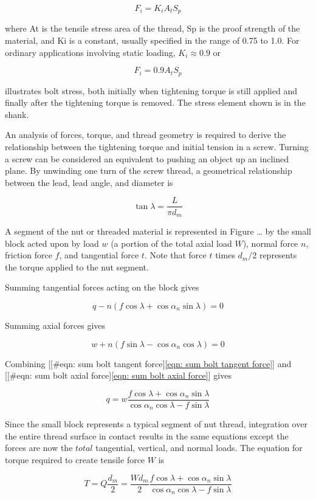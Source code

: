 \documentclass[a4paper,openany,12pt]{book}
\begin{document}
{{$$F_i = K_iA_tS_p$$

where At is the tensile stress area of the thread, Sp is the proof
strength of the material, and Ki is a constant, usually specified in the
range of 0.75 to 1.0. For ordinary applications involving static
loading, \(K_i \approx 0.9\) or

$$F_i = 0.9A_tS_p$$

illustrates bolt stress, both initially when tightening torque is still
applied and finally after the tightening torque is removed. The stress
element shown is in the shank.


An analysis of forces, torque, and thread geometry is required to derive
the relationship between the tightening torque and initial tension in a
screw. Turning a screw can be considered an equivalent to pushing an
object up an inclined plane. By unwinding one turn of the screw thread,
a geometrical relationship between the lead, lead angle, and diameter is

$$\tan \lambda  = \frac{L}{\pi d_m}$$

A segment of the nut or threaded material is represented in Figure \ldots{}
by the small block acted upon by load \(w\) (a portion of the total axial
load \(W\)), normal force \(n\), friction force \(f\), and tangential force
\(t\). Note that force \(t\) times \(d_m/2\) represents the torque applied to
the nut segment.

Summing tangential forces acting on the block gives

$$q - n(f\cos \lambda  + \cos \alpha_n\sin \lambda ) = 0$$

Summing axial forces gives

$$w + n(f\sin \lambda  - \cos \alpha_n\cos \lambda ) = 0$$

Combining
[[\#eqn: sum bolt tangent force]\ref{eqn: sum bolt tangent force}] and
[[\#eqn: sum bolt axial force]\ref{eqn: sum bolt axial force}] gives

$$q = w\frac{f\cos \lambda + \cos \alpha_n\sin \lambda }{\cos \alpha_n\cos \lambda  - f\sin \lambda }$$

Since the small block represents a typical segment of nut thread,
integration over the entire thread surface in contact results in the
same equations except the forces are now the \(total\) tangential,
vertical, and normal loads. The equation for torque required to create
tensile force \(W\) is

$$T = Q\frac{d_m}{2} = \frac{Wd_m}{2}\frac{f\cos \lambda + \cos \alpha_n\sin \lambda }{\cos \alpha_n\cos \lambda - f\sin \lambda }$$

}}
\end{document}
